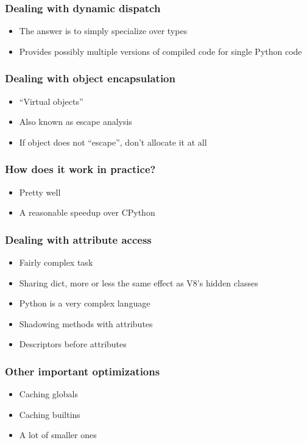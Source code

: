 \documentclass[utf8x]{beamer}
\begin{document}
\begin{frame}
  \frametitle{Dealing with dynamic dispatch}
  \begin{itemize}
    \item The answer is to simply specialize over types
    \item Provides possibly multiple versions of compiled code for
      single Python code
  \end{itemize}
\end{frame}

\begin{frame}
  \frametitle{Dealing with object encapsulation}
  \begin{itemize}
    \item ``Virtual objects''
    \item Also known as escape analysis
    \item If object does not ``escape'', don't allocate it at all
  \end{itemize}
\end{frame}

\begin{frame}
  \frametitle{How does it work in practice?}
  \begin{itemize}
    \pause
    \item Pretty well
      \pause
    \item A reasonable speedup over CPython
  \end{itemize}
\end{frame}

\begin{frame}
  \frametitle{Dealing with attribute access}
  \begin{itemize}
    \item Fairly complex task
    \item Sharing dict, more or less the same effect as V8's hidden
      classes
      \pause
    \item Python is a very complex language
    \item Shadowing methods with attributes
    \item Descriptors before attributes
  \end{itemize}
\end{frame}

\begin{frame}
  \frametitle{Other important optimizations}
  \begin{itemize}
    \item Caching globals
    \item Caching builtins
    \item A lot of smaller ones
  \end{itemize}
\end{frame}
\end{document}
